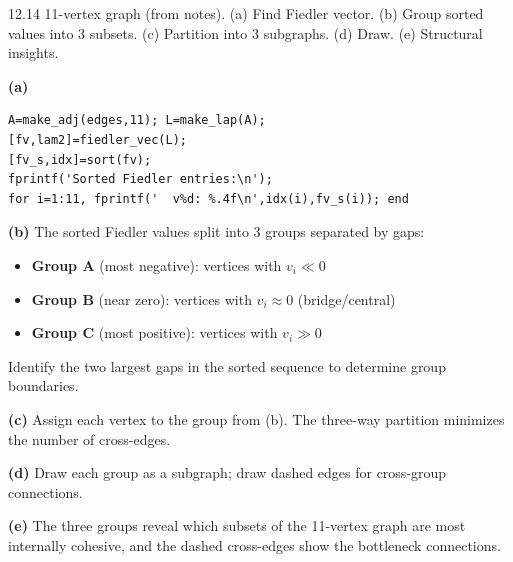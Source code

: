 \begin{exercise}{12.14}
11-vertex graph (from notes). (a) Find Fiedler vector. (b) Group sorted values into 3 subsets. (c) Partition into 3 subgraphs. (d) Draw. (e) Structural insights.
\end{exercise}
\begin{solution}
\textbf{(a)}
\begin{lstlisting}
A=make_adj(edges,11); L=make_lap(A);
[fv,lam2]=fiedler_vec(L);
[fv_s,idx]=sort(fv);
fprintf('Sorted Fiedler entries:\n');
for i=1:11, fprintf('  v%d: %.4f\n',idx(i),fv_s(i)); end
\end{lstlisting}

\textbf{(b)} The sorted Fiedler values split into 3 groups separated by gaps:
\begin{itemize}
  \item \textbf{Group A} (most negative): vertices with $v_i \ll 0$
  \item \textbf{Group B} (near zero): vertices with $v_i \approx 0$ (bridge/central)
  \item \textbf{Group C} (most positive): vertices with $v_i \gg 0$
\end{itemize}
Identify the two largest gaps in the sorted sequence to determine group boundaries.

\textbf{(c)} Assign each vertex to the group from (b). The three-way partition minimizes the number of cross-edges.

\textbf{(d)} Draw each group as a subgraph; draw dashed edges for cross-group connections.

\textbf{(e)} The three groups reveal which subsets of the 11-vertex graph are most internally cohesive, and the dashed cross-edges show the bottleneck connections.
\end{solution}

